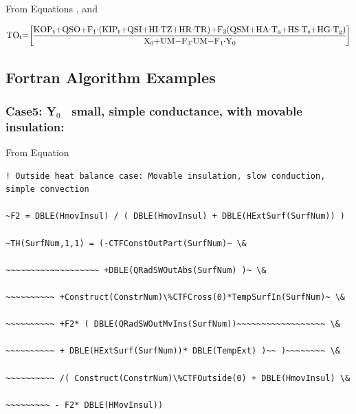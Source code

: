From Equations , and

\begin{equation}
\medmuskip=0mu
\thinmuskip=0mu
\thickmuskip=0mu
\nulldelimiterspace=0pt
\scriptspace=0pt
{\rm{T}}{{\rm{O}}_{\rm{t}}}{\rm{ = }}\left[ {\frac{{{\rm{KO}}{{\rm{P}}_{\rm{t}}} + {\rm{QSO}} + {{\rm{F}}_1}\cdot \left( {{\rm{KI}}{{\rm{P}}_{\rm{t}}}{\rm{ + QSI + HI}}\cdot {\rm{TZ + HR}}\cdot {\rm{TR}}} \right){\rm{ + }}{{\rm{F}}_{\rm{3}}}\left( {{\rm{QSM + HA}}\cdot {{\rm{T}}_{\rm{a}}}{\rm{ + HS}}\cdot {{\rm{T}}_{\rm{s}}}{\rm{ + HG}}\cdot {{\rm{T}}_{\rm{g}}}} \right)}}{{{{\rm{X}}_{\rm{0}}}{\rm{ + UM - }}{{\rm{F}}_{\rm{3}}}\cdot {\rm{UM - }}{{\rm{F}}_{\rm{1}}}\cdot {{\rm{Y}}_{\rm{0}}}}}} \right]{\rm{  }}
\end{equation}

\subsection{Fortran Algorithm Examples}\label{fortran-algorithm-examples}

\subsubsection{\texorpdfstring{Case5: Y\(_{0}\)~ small, simple conductance, with movable insulation:}{Case5: Y\_\{0\}~ small, simple conductance, with movable insulation:}}\label{case5-yux5f0-small-simple-conductance-with-movable-insulation-1}

From Equation

\begin{lstlisting}
! Outside heat balance case: Movable insulation, slow conduction, simple convection

~F2 = DBLE(HmovInsul) / ( DBLE(HmovInsul) + DBLE(HExtSurf(SurfNum)) )

~TH(SurfNum,1,1) = (-CTFConstOutPart(SurfNum)~ \&

~~~~~~~~~~~~~~~~~~~ +DBLE(QRadSWOutAbs(SurfNum) )~ \&

~~~~~~~~~~ +Construct(ConstrNum)\%CTFCross(0)*TempSurfIn(SurfNum)~ \&

~~~~~~~~~~ +F2* ( DBLE(QRadSWOutMvIns(SurfNum))~~~~~~~~~~~~~~~~~~ \&

~~~~~~~~~~ + DBLE(HExtSurf(SurfNum))* DBLE(TempExt) )~~ )~~~~~~~~ \&

~~~~~~~~~~ /( Construct(ConstrNum)\%CTFOutside(0) + DBLE(HmovInsul) \&

~~~~~~~~~ - F2* DBLE(HMovInsul))
\end{lstlisting}

